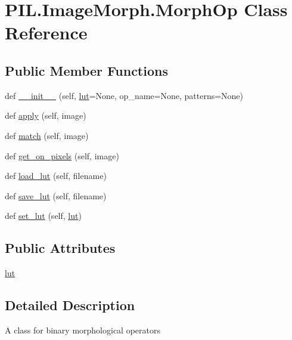\hypertarget{classPIL_1_1ImageMorph_1_1MorphOp}{}\section{P\+I\+L.\+Image\+Morph.\+Morph\+Op Class Reference}
\label{classPIL_1_1ImageMorph_1_1MorphOp}
\subsection*{Public Member Functions}
\begin{DoxyCompactItemize}
\item 
def \hyperlink{classPIL_1_1ImageMorph_1_1MorphOp_a14b63bf5707614d34d878571843929bb}{\+\_\+\+\_\+init\+\_\+\+\_\+} (self, \hyperlink{classPIL_1_1ImageMorph_1_1MorphOp_a2de6096e17c7ce39c6883d5eaf168c49}{lut}=None, op\+\_\+name=None, patterns=None)
\item 
def \hyperlink{classPIL_1_1ImageMorph_1_1MorphOp_ae9abe4b7d7671f5b4aa8249d8f5e0beb}{apply} (self, image)
\item 
def \hyperlink{classPIL_1_1ImageMorph_1_1MorphOp_ab758df9fb0a60561ebe9917c1b3d0844}{match} (self, image)
\item 
def \hyperlink{classPIL_1_1ImageMorph_1_1MorphOp_ad7b9fa495d1c7b53ffa643eb859ec688}{get\+\_\+on\+\_\+pixels} (self, image)
\item 
def \hyperlink{classPIL_1_1ImageMorph_1_1MorphOp_a1b3408b61ade6e6d9d3584f59fc07065}{load\+\_\+lut} (self, filename)
\item 
def \hyperlink{classPIL_1_1ImageMorph_1_1MorphOp_a084ee8ca1920ab38730a8bfe14469613}{save\+\_\+lut} (self, filename)
\item 
def \hyperlink{classPIL_1_1ImageMorph_1_1MorphOp_a84acb6a303ba56a2414914d840956aba}{set\+\_\+lut} (self, \hyperlink{classPIL_1_1ImageMorph_1_1MorphOp_a2de6096e17c7ce39c6883d5eaf168c49}{lut})
\end{DoxyCompactItemize}
\subsection*{Public Attributes}
\begin{DoxyCompactItemize}
\item 
\hyperlink{classPIL_1_1ImageMorph_1_1MorphOp_a2de6096e17c7ce39c6883d5eaf168c49}{lut}
\end{DoxyCompactItemize}


\subsection{Detailed Description}
\begin{DoxyVerb}A class for binary morphological operators\end{DoxyVerb}
 

